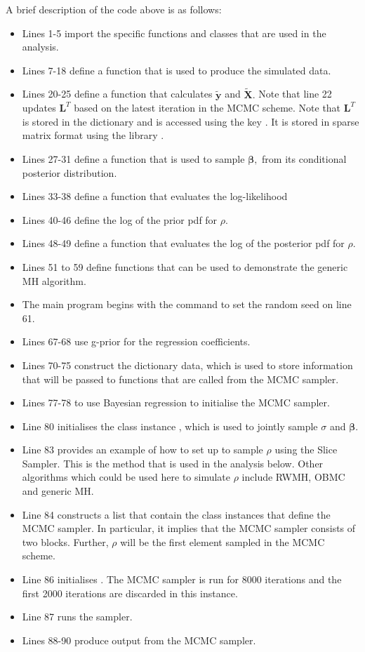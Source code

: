 \documentclass[article]{jss}
\begin{document}
A brief description of the code above is as follows:
\begin{itemize}
\item Lines 1-5 import the specific functions and classes that are
  used in the analysis.
\item Lines 7-18 define a function that is used to produce the
  simulated data.
\item Lines 20-25 define a function that calculates $\tilde{\bm{y}}$
  and $\bm{\tilde{X}}.$ Note that line 22 updates $\bm{L}^{T}$ based
  on the latest iteration in the MCMC scheme. Note that $\bm{L}^{T}$
  is stored in the  dictionary  and is
  accessed using the key . It is stored in sparse matrix
  format using the library .
\item Lines 27-31 define a function that is used to sample
  $\bm{\beta},$ from its conditional posterior distribution.
\item Lines 33-38 define a function that evaluates the log-likelihood
\item Lines 40-46 define the log of the prior pdf for $\rho$.
\item Lines 48-49 define a function that evaluates the log of the
  posterior pdf for $\rho.$
\item Lines 51 to 59 define functions that can be used to demonstrate
  the generic MH algorithm.
\item The main program begins with the command to set the random seed
  on line 61.
\item Lines 67-68 use g-prior for the regression coefficients.
\item Lines 70-75 construct the  dictionary data,
  which is used to store information that will be passed to functions
  that are called from the MCMC sampler.
\item Lines 77-78 to use Bayesian regression to initialise the MCMC sampler.
\item Line 80 initialises the class instance , which is
used to jointly sample $\sigma$ and $\bm{\beta}.$ 
\item Line 83 provides an example of how to set up  to
  sample $\rho$ using the Slice Sampler. This is the method that is
  used in the analysis below. Other algorithms which could be used
  here to simulate $\rho$ include RWMH, OBMC and generic MH.
\item Line 84 constructs a  list that contain the
  class instances that define the MCMC sampler. In particular, it
  implies that the MCMC sampler consists of two blocks. Further,
  $\rho$ will be the first element sampled in the MCMC scheme.
\item Line 86 initialises . The MCMC sampler is run for
  8000 iterations and the first 2000 iterations are discarded in this
  instance.
\item Line 87 runs the sampler.
\item Lines 88-90 produce output from the MCMC sampler.
\end{itemize}
\end{document}
